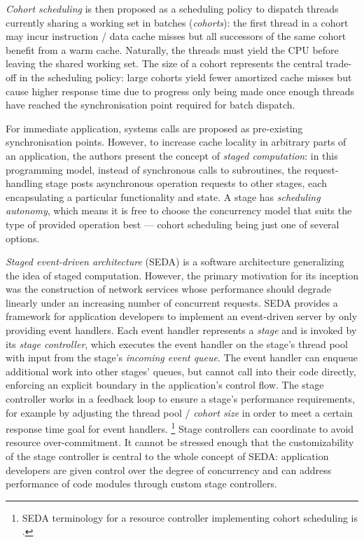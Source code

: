 \documentclass[12pt,a4paper]{book}
\begin{document}
\emph{Cohort scheduling} is then proposed as a scheduling policy to dispatch threads currently sharing a working set in batches (\emph{cohorts}):
the first thread in a cohort may incur instruction / data cache misses but all successors of the same cohort benefit from a warm cache.
Naturally, the threads must yield the CPU before leaving the shared working set.
The size of a cohort represents the central trade-off in the scheduling policy: large cohorts yield fewer amortized cache misses but cause higher response time due to progress only being made once enough threads have reached the synchronisation point required for batch dispatch.

For immediate application, systems calls are proposed as pre-existing synchronisation points.
However, to increase cache locality in arbitrary parts of an application, the authors present the concept of \emph{staged computation}:
in this programming model, instead of synchronous calls to subroutines, the request-handling stage posts asynchronous operation requests to other stages, each encapsulating a particular functionality and state.
A stage has \emph{scheduling autonomy}, which means it is free to choose the concurrency model that suits the type of provided operation best --- cohort scheduling being just one of several options.

\emph{Staged event-driven architecture} (SEDA) is a software architecture generalizing the idea of staged computation.
However, the primary motivation for its inception was the construction of network services whose performance should degrade linearly under an increasing number of concurrent requests.
SEDA provides a framework for application developers to implement an event-driven server by only providing event handlers.
Each event handler represents a \emph{stage} and is invoked by its \emph{stage controller}, which executes the event handler on the stage's thread pool with input from the stage's \emph{incoming event queue}.
The event handler can enqueue additional work into other stages' queues, but cannot call into their code directly, enforcing an explicit boundary in the application's control flow.
The stage controller works in a feedback loop to ensure a stage's performance requirements, for example by adjusting the thread pool / \emph{cohort size} in order to meet a certain response time goal for event handlers.%
\footnote{SEDA terminology for a resource controller implementing cohort scheduling is .}
Stage controllers can coordinate to avoid resource over-commitment.
It cannot be stressed enough that the customizability of the stage controller is central to the whole concept of SEDA:
application developers are given control over the degree of concurrency and can address performance of code modules through custom stage controllers.
\end{document}
